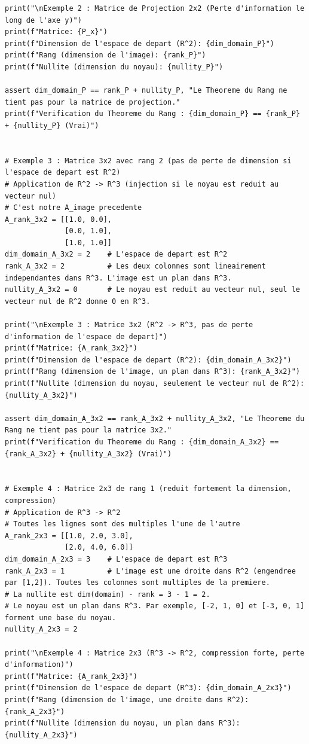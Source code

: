\documentclass{report}
\begin{document}
\begin{verbatim}
print("\nExemple 2 : Matrice de Projection 2x2 (Perte d'information le long de l'axe y)")
print(f"Matrice: {P_x}")
print(f"Dimension de l'espace de depart (R^2): {dim_domain_P}")
print(f"Rang (dimension de l'image): {rank_P}")
print(f"Nullite (dimension du noyau): {nullity_P}")

assert dim_domain_P == rank_P + nullity_P, "Le Theoreme du Rang ne tient pas pour la matrice de projection."
print(f"Verification du Theoreme du Rang : {dim_domain_P} == {rank_P} + {nullity_P} (Vrai)")


# Exemple 3 : Matrice 3x2 avec rang 2 (pas de perte de dimension si l'espace de depart est R^2)
# Application de R^2 -> R^3 (injection si le noyau est reduit au vecteur nul)
# C'est notre A_image precedente
A_rank_3x2 = [[1.0, 0.0],
              [0.0, 1.0],
              [1.0, 1.0]]
dim_domain_A_3x2 = 2    # L'espace de depart est R^2
rank_A_3x2 = 2          # Les deux colonnes sont lineairement independantes dans R^3. L'image est un plan dans R^3.
nullity_A_3x2 = 0       # Le noyau est reduit au vecteur nul, seul le vecteur nul de R^2 donne 0 en R^3.

print("\nExemple 3 : Matrice 3x2 (R^2 -> R^3, pas de perte d'information de l'espace de depart)")
print(f"Matrice: {A_rank_3x2}")
print(f"Dimension de l'espace de depart (R^2): {dim_domain_A_3x2}")
print(f"Rang (dimension de l'image, un plan dans R^3): {rank_A_3x2}")
print(f"Nullite (dimension du noyau, seulement le vecteur nul de R^2): {nullity_A_3x2}")

assert dim_domain_A_3x2 == rank_A_3x2 + nullity_A_3x2, "Le Theoreme du Rang ne tient pas pour la matrice 3x2."
print(f"Verification du Theoreme du Rang : {dim_domain_A_3x2} == {rank_A_3x2} + {nullity_A_3x2} (Vrai)")


# Exemple 4 : Matrice 2x3 de rang 1 (reduit fortement la dimension, compression)
# Application de R^3 -> R^2
# Toutes les lignes sont des multiples l'une de l'autre
A_rank_2x3 = [[1.0, 2.0, 3.0],
              [2.0, 4.0, 6.0]]
dim_domain_A_2x3 = 3    # L'espace de depart est R^3
rank_A_2x3 = 1          # L'image est une droite dans R^2 (engendree par [1,2]). Toutes les colonnes sont multiples de la premiere.
# La nullite est dim(domain) - rank = 3 - 1 = 2.
# Le noyau est un plan dans R^3. Par exemple, [-2, 1, 0] et [-3, 0, 1] forment une base du noyau.
nullity_A_2x3 = 2

print("\nExemple 4 : Matrice 2x3 (R^3 -> R^2, compression forte, perte d'information)")
print(f"Matrice: {A_rank_2x3}")
print(f"Dimension de l'espace de depart (R^3): {dim_domain_A_2x3}")
print(f"Rang (dimension de l'image, une droite dans R^2): {rank_A_2x3}")
print(f"Nullite (dimension du noyau, un plan dans R^3): {nullity_A_2x3}")


\end{verbatim}
\end{document}
